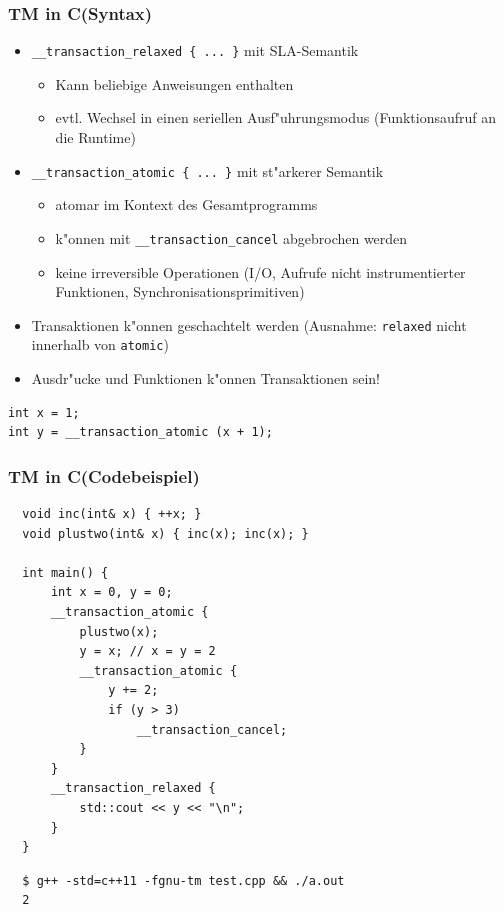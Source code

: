 \documentclass[t]{beamer}
\newcommand{\Rplus}{\protect\raisebox{.1ex}{+}}
\newcommand{\Cpp}{\mbox{C\Rplus\Rplus}\xspace}
\begin{document}
\begin{frame}[fragile]
  \frametitle{TM in \Cpp (Syntax)}

  \begin{itemize}
  \item \lstinline|__transaction_relaxed { ... }| mit SLA-Semantik
    \begin{itemize}
    \item Kann beliebige Anweisungen enthalten
    \item evtl. Wechsel in einen seriellen Ausf"uhrungsmodus
          (Funktionsaufruf an die Runtime)
    \end{itemize}
  \item \lstinline|__transaction_atomic { ... }| mit st"arkerer Semantik
    \begin{itemize}
    \item atomar im Kontext des Gesamtprogramms
    \item k"onnen mit \lstinline|__transaction_cancel| abgebrochen werden
    \item keine irreversible Operationen (I/O, Aufrufe nicht instrumentierter
          Funktionen, Synchronisationsprimitiven)
    \end{itemize}
  \item Transaktionen k"onnen geschachtelt werden (Ausnahme:
         \lstinline|relaxed| nicht innerhalb von \lstinline|atomic|)
  \item Ausdr"ucke und Funktionen k"onnen Transaktionen sein!
  \end{itemize}

  \begin{center}
  \begin{lstlisting}
int x = 1;
int y = __transaction_atomic (x + 1);
  \end{lstlisting}
  \end{center}
\end{frame}

\begin{frame}[fragile]
  \frametitle{TM in \Cpp (Codebeispiel)}

  \vspace{-1em}
  \begin{lstlisting}
  void inc(int& x) { ++x; }
  void plustwo(int& x) { inc(x); inc(x); }

  int main() {
      int x = 0, y = 0;
      __transaction_atomic {
          plustwo(x);
          y = x; // x = y = 2
          __transaction_atomic {
              y += 2;
              if (y > 3)
                  __transaction_cancel;
          }
      }
      __transaction_relaxed {
          std::cout << y << "\n";
      }
  }
  \end{lstlisting}

  \begin{lstlisting}
  $ g++ -std=c++11 -fgnu-tm test.cpp && ./a.out
  2
  \end{lstlisting}
\end{frame}
\end{document}
